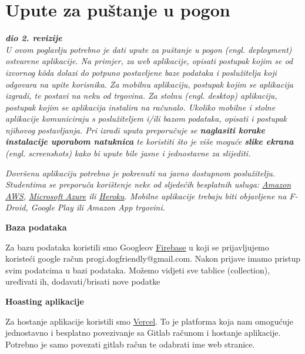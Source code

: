 			\eject 
		
		\section{Upute za puštanje u pogon}
		
			\textbf{\textit{dio 2. revizije}}\\
		
			 \textit{U ovom poglavlju potrebno je dati upute za puštanje u pogon (engl. deployment) ostvarene aplikacije. Na primjer, za web aplikacije, opisati postupak kojim se od izvornog kôda dolazi do potpuno postavljene baze podataka i poslužitelja koji odgovara na upite korisnika. Za mobilnu aplikaciju, postupak kojim se aplikacija izgradi, te postavi na neku od trgovina. Za stolnu (engl. desktop) aplikaciju, postupak kojim se aplikacija instalira na računalo. Ukoliko mobilne i stolne aplikacije komuniciraju s poslužiteljem i/ili bazom podataka, opisati i postupak njihovog postavljanja. Pri izradi uputa preporučuje se \textbf{naglasiti korake instalacije uporabom natuknica} te koristiti što je više moguće \textbf{slike ekrana} (engl. screenshots) kako bi upute bile jasne i jednostavne za slijediti.}
			
			
			 \textit{Dovršenu aplikaciju potrebno je pokrenuti na javno dostupnom poslužitelju. Studentima se preporuča korištenje neke od sljedećih besplatnih usluga: \href{https://aws.amazon.com/}{Amazon AWS}, \href{https://azure.microsoft.com/en-us/}{Microsoft Azure} ili \href{https://www.heroku.com/}{Heroku}. Mobilne aplikacije trebaju biti objavljene na F-Droid, Google Play ili Amazon App trgovini.}

   \textbf{Baza podataka}

    Za bazu podataka koristili smo Googleov \href{https://firebase.google.com/}{Firebase} u koji se prijavljujemo koristeći google račun progi.dogfriendly@gmail.com. Nakon prijave imamo pristup svim podatcima u bazi podataka. Možemo vidjeti sve tablice (collection), uređivati ih, dodavati/brisati nove podatke

    \textbf{Hoasting aplikacije}
    
    Za hostanje aplikacije koristili smo \href{https://vercel.com/}{Vercel}. To je platforma koja nam omogućuje jednostavno i besplatno povezivanje sa Gitlab računom i hostanje aplikacije. Potrebno je samo povezati gitlab račun te odabrati ime web stranice. 
			
			
			\eject 